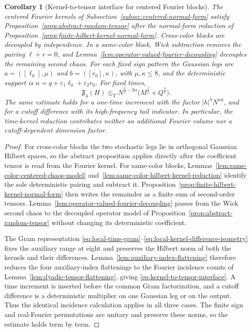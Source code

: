 \documentclass[10pt]{amsart}
\numberwithin{equation}{section}
\theoremstyle{plain}
\newtheorem{corollary}[theorem]{Corollary}
\theoremstyle{definition}
\theoremstyle{remark}
\begin{document}
\begin{corollary}[Kernel-to-tensor interface for centered Fourier blocks]\label{cor:centered-fourier-block-tensor}
The centered Fourier kernels of Subsection~\ref{subsec:centered-normal-form} satisfy Proposition~\ref{prop:abstract-random-tensor} after the normal-form reduction of Proposition~\ref{prop:finite-hilbert-kernel-normal-form}.  Cross-color blocks are decoupled by independence.  In a same-color block, Wick subtraction removes the pairing $\ell+r=0$, and Lemma~\ref{lem:operator-valued-fourier-decoupling} decouples the remaining second chaos.  For each fixed sign pattern the Gaussian legs are $a=([\ell_0],\mu)$ and $b=([r_0],\kappa)$, with $\mu,\kappa\le8$, and the deterministic support is $n=q+\varepsilon_1\ell_0+\varepsilon_2r_0$.  For fixed times,
\begin{equation}\label{eq:kernel-to-tensor-interface}
        \mathfrak F_4(H)
        \lesssim_T
        N^{\frac32-3\alpha}
        \bigl(M^{\frac32}+Q^{\frac32}\bigr).
\end{equation}
The same estimate holds for a one-time increment with the factor
$|h|^\eta N^{\alpha\eta}$, and for a cutoff difference with its high-frequency
tail indicator.  In particular, the time-kernel reduction contributes neither
an additional Fourier volume nor a cutoff-dependent dimension factor.
\end{corollary}

\begin{proof}
For cross-color blocks the two stochastic legs lie in orthogonal Gaussian Hilbert spaces, so the abstract proposition applies directly after the coefficient tensor is read from the Fourier kernel.  For same-color blocks, Lemmas~\ref{lem:same-color-centered-chaos-model} and~\ref{lem:same-color-hilbert-kernel-reduction} identify the sole deterministic pairing and subtract it.  Proposition~\ref{prop:finite-hilbert-kernel-normal-form} then writes the remainder as a finite sum of second-order tensors.  Lemma~\ref{lem:operator-valued-fourier-decoupling} passes from the Wick second chaos to the decoupled operator model of Proposition~\ref{prop:abstract-random-tensor} without changing its deterministic coefficient.

The Gram representation \eqref{eq:local-time-gram}--\eqref{eq:local-kernel-difference-isometry} fixes the auxiliary range at eight and preserves the Hilbert norm of both the kernels and their differences.  Lemma~\ref{lem:auxiliary-index-flattening} therefore reduces the four auxiliary-index flattenings to the Fourier incidence counts of Lemma~\ref{lem:dyadic-tensor-flattening}, giving \eqref{eq:kernel-to-tensor-interface}.  A time increment is inserted before the common Gram factorization, and a cutoff difference is a deterministic multiplier on one Gaussian leg or on the output.  Thus the identical incidence calculation applies in all three cases.  The finite sign and real-Fourier permutations are unitary and preserve these norms, so the estimate holds term by term.
\end{proof}
\end{document}
